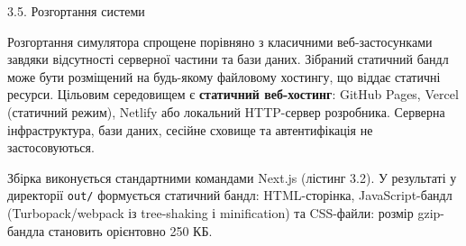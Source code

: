 \documentclass[
]{article}
\newcommand{\passthrough}[1]{#1}
\begin{document}
\protect{}\label{Xff4a6440b3448fe2a05c600581de26ed60a0266}{}3.5.
Розгортання системи

Розгортання симулятора спрощене порівняно з класичними веб-застосунками
завдяки відсутності серверної частини та бази даних. Зібраний статичний
бандл може бути розміщений на будь-якому файловому хостингу, що віддає
статичні ресурси. Цільовим середовищем є \textbf{статичний веб-хостинг}:
GitHub Pages, Vercel (статичний режим), Netlify або локальний
HTTP-сервер розробника. Серверна інфраструктура, бази даних, сесійне
сховище та автентифікація не застосовуються.

Збірка виконується стандартними командами Next.js (лістинг 3.2). У
результаті у директорії
\passthrough{\lstinline!out!}\passthrough{\lstinline!/!} формується
статичний бандл: HTML-сторінка, JavaScript-бандл (Turbopack/webpack із
tree-shaking і minification) та CSS-файли: розмір gzip-бандла становить
орієнтовно 250 КБ.
\end{document}

